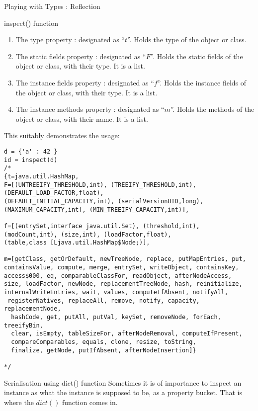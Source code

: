 \begin{section}{Playing with Types : Reflection}
\begin{subsection}{inspect() function}
\begin{enumerate}
\item{The type property : designated as ``$t$''.  Holds the type of the object or class. }
\item{The static fields property : designated as ``$F$''.  
        Holds the static fields of the object or class, with their type. It is a list.}
\item{The instance fields property : designated as ``$f$''.  
        Holds the instance fields of the object or class, with their type. It is a list.}
\item{The instance methods property : designated as ``$m$''.  
        Holds the methods of the object or class, with their name. It is a list.}
\end{enumerate}

This suitably demonstrates the usage:
\begin{center}\begin{minipage}{\linewidth}
\begin{lstlisting}[style=JexlStyle]
d = {'a' : 42 }
id = inspect(d)
/*
{t=java.util.HashMap, 
F=[(UNTREEIFY_THRESHOLD,int), (TREEIFY_THRESHOLD,int), 
(DEFAULT_LOAD_FACTOR,float), 
(DEFAULT_INITIAL_CAPACITY,int), (serialVersionUID,long), 
(MAXIMUM_CAPACITY,int), (MIN_TREEIFY_CAPACITY,int)], 

f=[(entrySet,interface java.util.Set), (threshold,int), 
(modCount,int), (size,int), (loadFactor,float), 
(table,class [Ljava.util.HashMap$Node;)], 

m=[getClass, getOrDefault, newTreeNode, replace, putMapEntries, put, 
containsValue, compute, merge, entrySet, writeObject, containsKey, 
access$000, eq, comparableClassFor, readObject, afterNodeAccess, 
size, loadFactor, newNode, replacementTreeNode, hash, reinitialize, 
internalWriteEntries, wait, values, computeIfAbsent, notifyAll,
 registerNatives, replaceAll, remove, notify, capacity, replacementNode,
  hashCode, get, putAll, putVal, keySet, removeNode, forEach, treeifyBin, 
  clear, isEmpty, tableSizeFor, afterNodeRemoval, computeIfPresent, 
  compareComparables, equals, clone, resize, toString, 
  finalize, getNode, putIfAbsent, afterNodeInsertion]}

*/
\end{lstlisting}
\end{minipage}\end{center}

\end{subsection}

\begin{subsection}{Serialisation using dict() function}
Sometimes it is of importance to inspect an instance as 
what the instance is supposed to be, as a property bucket.
That is where the $dict()$ function comes in.


\end{subsection}
\end{section}
